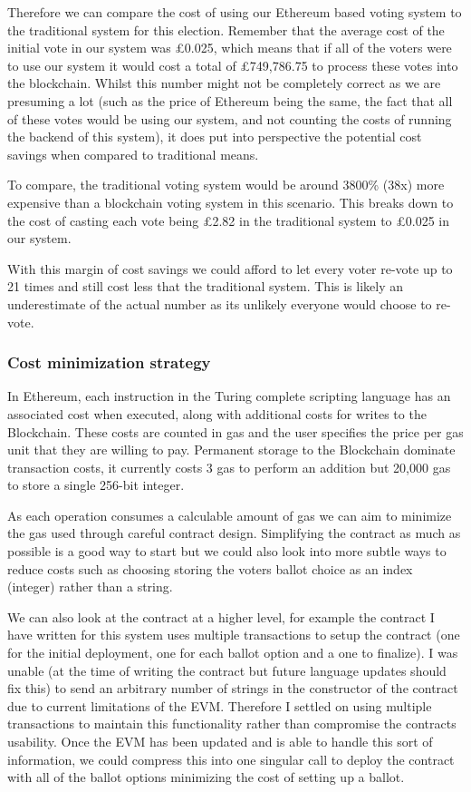 \documentclass{article}
\begin{document}
	Therefore we can compare the cost of using our Ethereum based voting system to the traditional system for this election. Remember that the average cost of the initial vote in our system was \pounds0.025, which means that if all of the voters were to use our system it would cost a total of \pounds749,786.75 to process these votes into the blockchain. Whilst this number might not be completely correct as we are presuming a lot (such as the price of Ethereum being the same, the fact that all of these votes would be using our system, and not counting the costs of running the backend of this system), it does put into perspective the potential cost savings when compared to traditional means.
	
	To compare, the traditional voting system would be around 3800\% (38x) more expensive than a blockchain voting system in this scenario. This breaks down to the cost of casting each vote being \pounds2.82 in the traditional system to \pounds0.025 in our system.
	
	With this margin of cost savings we could afford to let every voter re-vote up to 21 times and still cost less that the traditional system. This is likely an underestimate of the actual number as its unlikely everyone would choose to re-vote.
	
	\clearpage
	\subsubsection{Cost minimization strategy}
	In Ethereum, each instruction in the Turing complete scripting language has an associated cost when executed, along with additional costs for writes to the Blockchain. These costs are counted in gas and the user specifies the price per gas unit that they are willing to pay. Permanent storage to the Blockchain dominate transaction costs, it currently costs 3 gas to perform an addition but 20,000 gas to store a single 256-bit integer.
	
	As each operation consumes a calculable amount of gas we can aim to minimize the gas used through careful contract design. Simplifying the contract as much as possible is a good way to start but we could also look into more subtle ways to reduce costs such as choosing storing the voters ballot choice as an index (integer) rather than a string.
	
	We can also look at the contract at a higher level, for example the contract I have written for this system uses multiple transactions to setup the contract (one for the initial deployment, one for each ballot option and a one to finalize). I was unable (at the time of writing the contract but future language updates should fix this) to send an arbitrary number of strings in the constructor of the contract due to current limitations of the EVM. Therefore I settled on using multiple transactions to maintain this functionality rather than compromise the contracts usability. Once the EVM has been updated and is able to handle this sort of information, we could compress this into one singular call to deploy the contract with all of the ballot options minimizing the cost of setting up a ballot.
	
\end{document}
